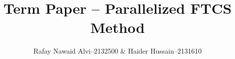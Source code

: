 \documentclass[11pt]{article}
\title{Term Paper – Parallelized FTCS Method}
\author{Rafay Nawaid Alvi–2132500 \& Haider Hussain–2131610}
\begin{document}
\maketitle

\tableofcontents
\pagebreak



\pagebreak

\pagebreak

\newpage
\listoffigures
\listoftables


\newpage
\printbibliography
\end{document}
